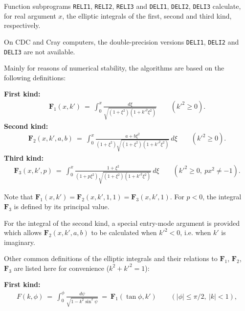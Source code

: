                        
                  
\Submitter{ }                           
                      \Revised{}
Function subprograms {\tt RELI1}, {\tt RELI2}, {\tt RELI3}
and {\tt DELI1}, {\tt DELI2}, {\tt DELI3} calculate, for real
argument $x$, the elliptic integrals of the first, second and
third kind, respectively.
\par
On CDC and Cray computers, the double-precision versions {\tt DELI1},
{\tt DELI2} and {\tt DELI3} are not available.
\par
Mainly for reasons of numerical stability, the algorithms are based on
the following definitions:
\par
{\bf First kind:}
\begin{eqnarray*}
\mathbf{F}_1(x,k') \ = \  \displaystyle
\int_0^x \frac{d\xi}{\sqrt{(1+\xi^2)(1+{k'}^2\xi^2)}}
\qquad ({k'}^2 \ge 0).
\end{eqnarray*}
{\bf Second kind:}
\begin{eqnarray*}
\mathbf{F}_2(x,k',a,b) \ = \ \displaystyle
\int_0^x \frac{a+b\xi^2}{(1+\xi^2)\sqrt{(1+\xi^2)(1+{k'}^2\xi^2)}}\,d\xi
\qquad ({k'}^2 \ge 0).
\end{eqnarray*}
{\bf Third kind:}
\begin{eqnarray*}
\mathbf{F}_3(x,k',p) \ = \ \displaystyle
\int_0^x \frac{1+\xi^2}{(1+p\xi^2)\sqrt{(1+\xi^2)(1+{k'}^2\xi^2)}}\,d\xi
\qquad ({k'}^2 \ge 0, \ px^2 \ne -1).
\end{eqnarray*}
\par
Note that $\mathbf{F}_1(x,k') = \mathbf{F}_2(x,k',1,1) =
\mathbf{F}_3(x,k',1)$.
For $p < 0$, the integral $\mathbf{F}_3$ is defined by its principal
value.
\par
For the integral of the second kind, a special entry-mode argument
is provided which allows $\mathbf{F}_2(x,k',a,b)$ to be calculated when
${k'}^2 < 0$, i.e. when $k'$ is imaginary.
\par
Other common definitions of the elliptic integrals and their
relations to $\mathbf{F}_1$, $\mathbf{F}_2$, $\mathbf{F}_3$ are
listed here for convenience ($k^2+{k'}^2=1$):
\par
{\bf First kind:}
\begin{eqnarray*}
F(k,\phi) \ = \ \displaystyle \int_0^\phi
\frac{d\psi}{\sqrt{1-k^2\sin^2 \psi}} \ = \ \mathbf{F}_1(\tan \phi,k')
\qquad (|\phi| \le \pi/2, \ |k| < 1),
\end{eqnarray*}
